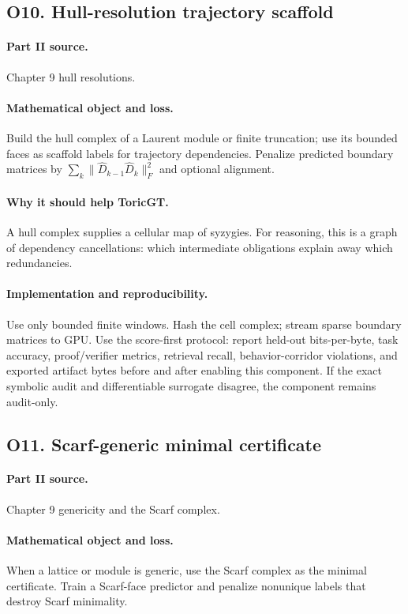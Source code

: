 \documentclass[11pt]{article}
\theoremstyle{definition}
\begin{document}
\subsection{O10. Hull-resolution trajectory scaffold}
\paragraph{Part II source.} Chapter 9 hull resolutions.
\paragraph{Mathematical object and loss.} Build the hull complex of a Laurent module or finite truncation; use its bounded faces as scaffold labels for trajectory dependencies.  Penalize predicted boundary matrices by $\sum_k\|\hat D_{k-1}\hat D_k\|_F^2$ and optional alignment.
\paragraph{Why it should help ToricGT.} A hull complex supplies a cellular map of syzygies.  For reasoning, this is a graph of dependency cancellations: which intermediate obligations explain away which redundancies.
\paragraph{Implementation and reproducibility.} Use only bounded finite windows.  Hash the cell complex; stream sparse boundary matrices to GPU.  Use the score-first protocol: report held-out bits-per-byte, task accuracy, proof/verifier metrics, retrieval recall, behavior-corridor violations, and exported artifact bytes before and after enabling this component.  If the exact symbolic audit and differentiable surrogate disagree, the component remains audit-only.


\subsection{O11. Scarf-generic minimal certificate}
\paragraph{Part II source.} Chapter 9 genericity and the Scarf complex.
\paragraph{Mathematical object and loss.} When a lattice or module is generic, use the Scarf complex as the minimal certificate.  Train a Scarf-face predictor and penalize nonunique labels that destroy Scarf minimality.
\end{document}
